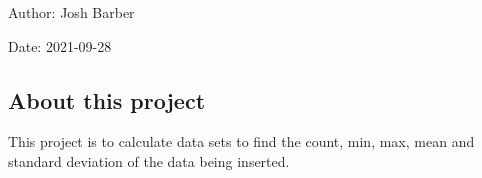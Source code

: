 Author\+: Josh Barber

Date\+: 2021-\/09-\/28

\subsection*{About this project}

This project is to calculate data sets to find the count, min, max, mean and standard deviation of the data being inserted. 